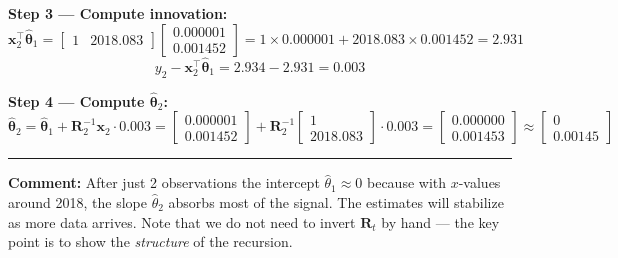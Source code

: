 \documentclass[11pt,a4paper]{article}
\begin{document}
\textbf{Step 3 --- Compute innovation:}
\[
\boldsymbol{x}_2^\top \hat{\boldsymbol{\theta}}_1
= \begin{bmatrix} 1 & 2018.083 \end{bmatrix} \begin{bmatrix} 0.000001 \\ 0.001452 \end{bmatrix}
= 1 \times 0.000001 + 2018.083 \times 0.001452
= 2.931
\]
\[
y_2 - \boldsymbol{x}_2^\top \hat{\boldsymbol{\theta}}_1 = 2.934 - 2.931 = 0.003
\]

\textbf{Step 4 --- Compute $\hat{\boldsymbol{\theta}}_2$:}
\[
\hat{\boldsymbol{\theta}}_2
= \hat{\boldsymbol{\theta}}_1 + \boldsymbol{R}_2^{-1} \boldsymbol{x}_2 \cdot 0.003
= \begin{bmatrix} 0.000001 \\ 0.001452 \end{bmatrix} + \boldsymbol{R}_2^{-1} \begin{bmatrix} 1 \\ 2018.083 \end{bmatrix} \cdot 0.003
= \begin{bmatrix} 0.000000 \\ 0.001453 \end{bmatrix}
\approx \begin{bmatrix} 0 \\ 0.00145 \end{bmatrix}
\]

\vspace{1em}
\hrule
\vspace{1em}

\textbf{Comment:} After just 2 observations the intercept $\hat\theta_1 \approx 0$ because with $x$-values around 2018, the slope $\hat\theta_2$ absorbs most of the signal. The estimates will stabilize as more data arrives. Note that we do not need to invert $\boldsymbol{R}_t$ by hand --- the key point is to show the \emph{structure} of the recursion.
\end{document}
